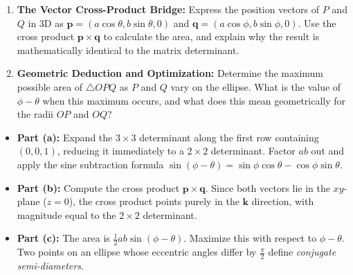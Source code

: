 \begin{problem}
\begin{enumerate}[label=\textbf{(\alph*)}]
    \item \textbf{The Vector Cross-Product Bridge:}
    Express the position vectors of $P$ and $Q$ in 3D as $\mathbf{p} = (a\cos\theta, b\sin\theta, 0)$ and $\mathbf{q} = (a\cos\phi, b\sin\phi, 0)$. Use the cross product $\mathbf{p} \times \mathbf{q}$ to calculate the area, and explain why the result is mathematically identical to the matrix determinant.

    \item \textbf{Geometric Deduction and Optimization:}
    Determine the maximum possible area of $\triangle OPQ$ as $P$ and $Q$ vary on the ellipse. What is the value of $\phi - \theta$ when this maximum occurs, and what does this mean geometrically for the radii $OP$ and $OQ$?
\end{enumerate}
\end{problem}

\begin{hint}
\begin{itemize}
    \item \textbf{Part (a):} Expand the $3 \times 3$ determinant along the first row containing $(0, 0, 1)$, reducing it immediately to a $2 \times 2$ determinant. Factor $ab$ out and apply the sine subtraction formula $\sin(\phi-\theta) = \sin\phi\cos\theta - \cos\phi\sin\theta$.
    \item \textbf{Part (b):} Compute the cross product $\mathbf{p} \times \mathbf{q}$. Since both vectors lie in the $xy$-plane ($z=0$), the cross product points purely in the $\mathbf{k}$ direction, with magnitude equal to the $2 \times 2$ determinant.
    \item \textbf{Part (c):} The area is $\frac{1}{2}ab\sin(\phi-\theta)$. Maximize this with respect to $\phi-\theta$. Two points on an ellipse whose eccentric angles differ by $\frac{\pi}{2}$ define \emph{conjugate semi-diameters}.
\end{itemize}
\end{hint}

